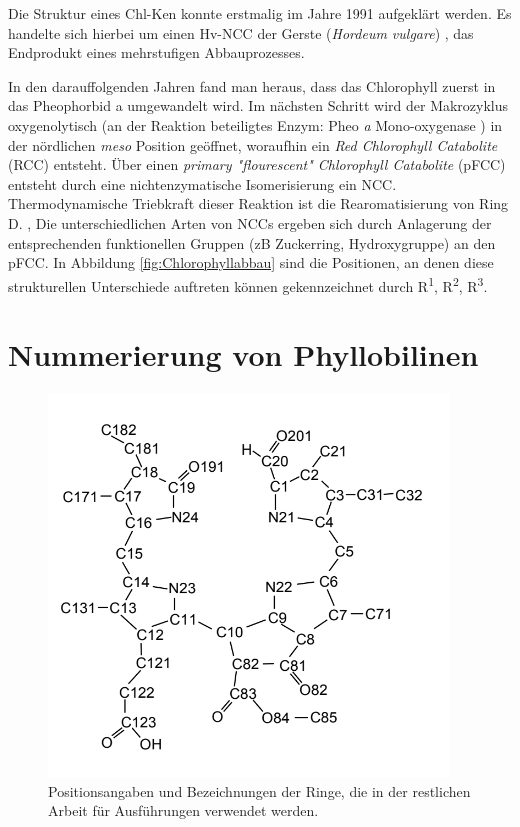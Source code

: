 Die Struktur eines \gls{Chl-K}en konnte erstmalig im Jahre 1991 aufgeklärt werden. Es handelte sich hierbei um einen Hv-\gls{NCC} der Gerste (\textit{Hordeum vulgare}) \cite{ErsterKatabolit}, das Endprodukt eines mehrstufigen Abbauprozesses. 

In den darauffolgenden Jahren fand man heraus, dass das Chlorophyll zuerst in das Pheophorbid a umgewandelt wird. Im nächsten Schritt wird der Makrozyklus oxygenolytisch (an der Reaktion beteiligtes Enzym: Pheo \textit{a} Mono-oxygenase \cite{ChlorophyllCatabolitesEnzyme}) in der nördlichen \textit{meso} Position geöffnet, woraufhin ein \textit{Red Chlorophyll Catabolite} (RCC) entsteht. 
Über einen \textit{primary "flourescent" Chlorophyll Catabolite} (pFCC) entsteht durch eine nichtenzymatische Isomerisierung ein \gls{NCC}. Thermodynamische Triebkraft dieser Reaktion ist die Rearomatisierung von Ring D. \cite{FCCKatabolit}, \cite{ChlorophyllCatabolites} Die unterschiedlichen Arten von \gls{NCC}s ergeben sich durch Anlagerung der entsprechenden funktionellen Gruppen (\gls{zB} Zuckerring, Hydroxygruppe) an den pFCC. \cite{ChlorophyllCatabolites} In Abbildung \ref{fig:Chlorophyllabbau} sind die Positionen, an denen diese strukturellen Unterschiede auftreten können gekennzeichnet durch R\textsuperscript{1}, R\textsuperscript{2}, R\textsuperscript{3}.

\section{Nummerierung von Phyllobilinen}

\begin{figure}[!hbtp]
  \centering
  \includegraphics[scale=0.61]{figures/Kapitel2/VWA_Chl-Nummerierung.png}
  \caption[Nummerierung von Phyllobilinen, Quelle: Mathias Scherl]{Positionsangaben und Bezeichnungen der Ringe, die in der restlichen Arbeit für Ausführungen verwendet werden.}
  \label{fig:NummerierungPhyllobiline}
\end{figure}



